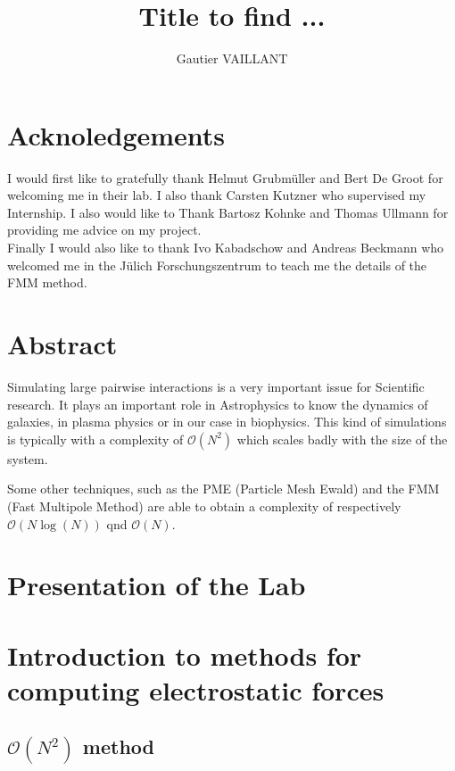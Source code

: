 \documentclass[12pt,twoside,a4paper]{report}
\title{Title to find ...}
\author{Gautier VAILLANT}
\begin{document}
\maketitle

\chapter*{Acknoledgements}

I would first like to gratefully thank Helmut Grubmüller and Bert De Groot for welcoming me in their lab. I also thank Carsten Kutzner who supervised my Internship. I also would like to Thank Bartosz Kohnke and Thomas Ullmann for providing me advice on my project.\\ 

Finally I would also like to thank Ivo Kabadschow and Andreas Beckmann who welcomed me in the Jülich Forschungszentrum to teach me the details of the FMM method. 

\chapter*{Abstract}

Simulating large pairwise interactions is a very important issue for Scientific research. It plays an important role in Astrophysics to know the dynamics of galaxies, in plasma physics or in our case in biophysics. This kind of simulations is typically with a complexity of $\mathcal{O}(N^2)$ which scales badly with the size of the system.

Some other techniques, such as the PME (Particle Mesh Ewald) and the FMM (Fast Multipole Method) are able to obtain a complexity of respectively $\mathcal{O}(N\log(N))$ qnd $\mathcal{O}(N)$.

\tableofcontents

\chapter*{Presentation of the Lab}

\chapter{Introduction to methods for computing electrostatic forces}


\section{$\mathcal{O}(N^2)$ method }
\end{document}

